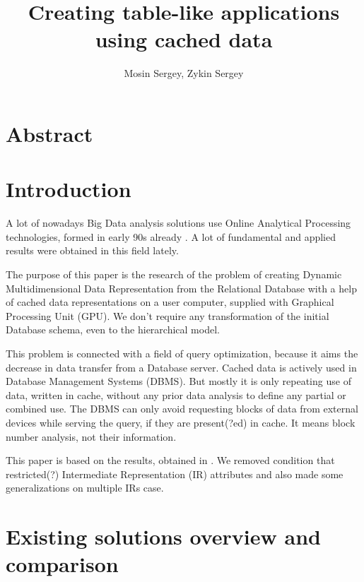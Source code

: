\documentclass[10pt,a4paper]{article}
\author{Mosin Sergey, Zykin Sergey}
\title{Creating table-like applications using cached data}
\author{
Mosin Sergey, Zykin Sergey \footnote{The paper is supported by RFFI grant
#12-07-00066-a}
\date{}
}
\begin{document}
\maketitle
\section{Abstract}

\section{Introduction}
A lot of nowadays Big Data analysis solutions use Online Analytical Processing
technologies, formed in early 90s already \cite{codd}. A lot of fundamental
\cite{lecht,lehner,mazon} and applied \cite{vassi, peder, progressive, giorg}
results were obtained in this field lately.

The purpose of this paper is the research of the problem of creating Dynamic
Multidimensional Data Representation from the Relational Database with a help of
cached data representations on a user computer, supplied with Graphical
Processing Unit (GPU). We don't require any transformation of the initial
Database schema, even to the hierarchical model.

This problem is connected with a field of query optimization, because it aims
the decrease in data transfer from a Database server. Cached data is actively
used in Database Management Systems (DBMS). But mostly it is only repeating use
of data, written in cache, without any prior data analysis to define any partial
or combined use. The DBMS can only avoid requesting blocks of data from external
devices while serving the query, if they are present(?ed) in cache. It means
block number analysis, not their information.

This paper is based on the results, obtained in \cite{zyk_pol}. We removed
condition that restricted(?) Intermediate Representation (IR) attributes and
also made some generalizations on multiple IRs case.

\section{Existing solutions overview and comparison}
\end{document}
